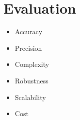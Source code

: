 \chapter{Evaluation} \label{chap:evaluation}


\begin{itemize}
	\item Accuracy
	\item Precision
	\item Complexity
	\item Robustness %
	\item Scalability %
	\item Cost
\end{itemize}



